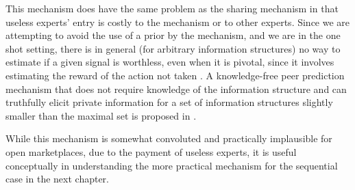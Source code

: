 This mechanism does have the same problem as the sharing mechanism in that useless experts' entry is costly to the mechanism or to other experts.
Since we are attempting to avoid the use of a prior by the mechanism, and we are in the one shot setting, there is in general (for arbitrary information structures) no way to estimate if a given signal is worthless, even when it is pivotal, since it involves estimating the reward of the action not taken \cite{della2012crowd,waggoner2014output, witkowski2014robust}.
A knowledge-free peer prediction mechanism that does not require knowledge of the information structure and can truthfully elicit private information for a set of information structures slightly smaller than the maximal set is proposed in \cite{zhang2014elicitability}. 


While this mechanism is somewhat convoluted and practically implausible for open marketplaces, due to the payment of useless experts, it is useful conceptually in understanding the more practical mechanism for the sequential case in the next chapter.







